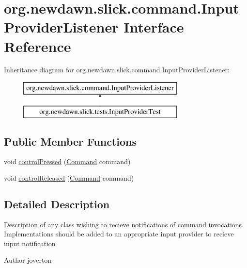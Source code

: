 \hypertarget{interfaceorg_1_1newdawn_1_1slick_1_1command_1_1_input_provider_listener}{}\section{org.\+newdawn.\+slick.\+command.\+Input\+Provider\+Listener Interface Reference}
\label{interfaceorg_1_1newdawn_1_1slick_1_1command_1_1_input_provider_listener}
Inheritance diagram for org.\+newdawn.\+slick.\+command.\+Input\+Provider\+Listener\+:\begin{figure}[H]
\begin{center}
\leavevmode
\includegraphics[height=2.000000cm]{interfaceorg_1_1newdawn_1_1slick_1_1command_1_1_input_provider_listener}
\end{center}
\end{figure}
\subsection*{Public Member Functions}
\begin{DoxyCompactItemize}
\item 
void \mbox{\hyperlink{interfaceorg_1_1newdawn_1_1slick_1_1command_1_1_input_provider_listener_a6c01290edae31f20d1577ffa7e0c3907}{control\+Pressed}} (\mbox{\hyperlink{interfaceorg_1_1newdawn_1_1slick_1_1command_1_1_command}{Command}} command)
\item 
void \mbox{\hyperlink{interfaceorg_1_1newdawn_1_1slick_1_1command_1_1_input_provider_listener_a28d87cd5fecc65f097e2034abe58bc7a}{control\+Released}} (\mbox{\hyperlink{interfaceorg_1_1newdawn_1_1slick_1_1command_1_1_command}{Command}} command)
\end{DoxyCompactItemize}


\subsection{Detailed Description}
Description of any class wishing to recieve notifications of command invocations. Implementations should be added to an appropriate input provider to recieve input notification

\begin{DoxyAuthor}{Author}
joverton 
\end{DoxyAuthor}


